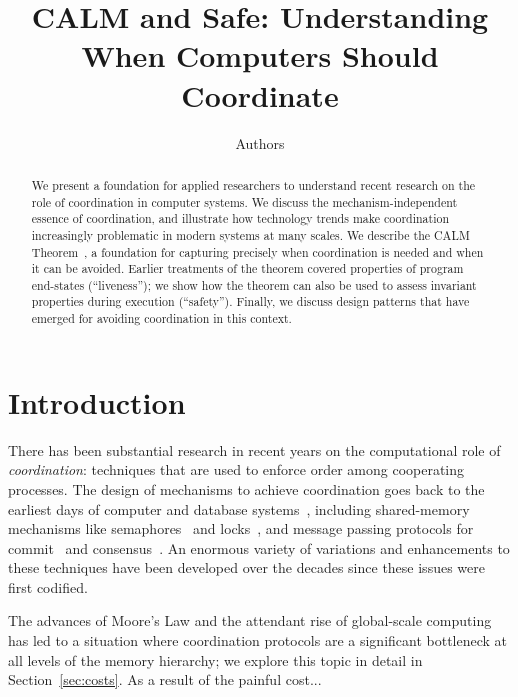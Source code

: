 \documentclass{sig-alternate}
\begin{document}
\title{CALM and Safe: Understanding When Computers Should Coordinate}

\author{
Authors
}

\maketitle

\begin{abstract}
We present a foundation for applied researchers to understand recent research on the role of coordination in computer systems.  We discuss the mechanism-independent essence of coordination, and illustrate how technology trends make coordination increasingly problematic in modern systems at many scales.  We describe the CALM Theorem~\cite{}, a foundation for capturing precisely when coordination is needed and when it can be avoided.  Earlier treatments of the theorem covered properties of program end-states (``liveness''); we show how the theorem can also be used to assess invariant properties during execution (``safety'').  Finally, we discuss design patterns that have emerged for avoiding coordination in this context.  
\end{abstract}

\section{Introduction}
There has been substantial research in recent years on the computational role of \emph{coordination}: techniques that are used to enforce order among cooperating processes.  The design of mechanisms to achieve coordination goes back to the earliest days of computer and database systems~\cite{grayreuter,seminalosbook}, including shared-memory mechanisms like semaphores~\cite{semaphores} and locks~\cite{2pl}, and message passing protocols for commit~\cite{2pl,3pl} and consensus~\cite{paxos,virtualsynchrony}.  An enormous variety of variations and enhancements to these techniques have been developed over the decades since these issues were first codified.

The advances of Moore's Law and the attendant rise of global-scale computing has led to a situation where coordination protocols are a significant bottleneck at all levels of the memory hierarchy; we explore this topic in detail in Section~\ref{sec:costs}.  As a result of the painful cost...
\end{document}
